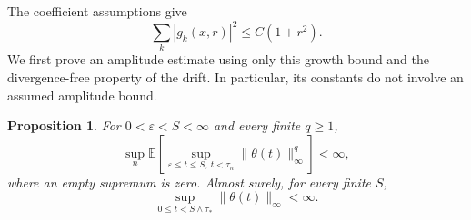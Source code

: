 \documentclass[11pt]{amsart}
\newtheorem{proposition}[theorem]{Proposition}
\theoremstyle{remark}
\numberwithin{equation}{section}
\newcommand{\EE}{\mathbb E}
\newcommand{\norm}[1]{\lVert#1\rVert}
\begin{document}
The coefficient assumptions give
\begin{equation}\label{eq:growth}
 \sum_k|g_k(x,r)|^2\leq C(1+r^2).
\end{equation}
We first prove an amplitude estimate using only this growth bound and the
divergence-free property of the drift. In particular, its constants do not
involve an assumed amplitude bound.

\begin{proposition}\label{prop:amplitude}
For $0<\varepsilon<S<\infty$ and every finite $q\geq1$,
\begin{equation}\label{eq:amplitudemoments}
 \sup_n\EE\left[\sup_{\varepsilon\leq t\leq S,\ t<\tau_n}
             \norm{\theta(t)}_\infty^q\right]<\infty,
\end{equation}
where an empty supremum is zero. Almost surely, for every finite $S$,
\begin{equation}\label{eq:amplitudeaslifetime}
 \sup_{0\leq t<S\wedge\tau_*}\norm{\theta(t)}_\infty<\infty.
\end{equation}
\end{proposition}
\end{document}
